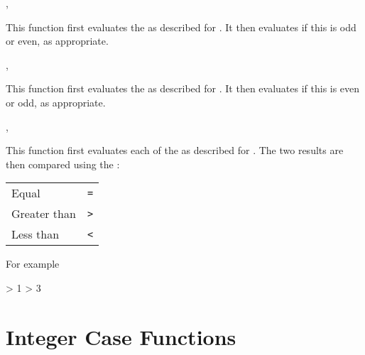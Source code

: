 \documentclass[oneside]{book}
\begin{document}
\begin{function}{\IntIfOdd,\IntIfOddTF}
\begin{syntax}
 
   
\end{syntax}
This function first evaluates the 
as described for .
It then evaluates if this is odd or even, as appropriate.
\end{function}

\begin{function}{\IntIfEven,\IntIfEvenTF}
\begin{syntax}
 
   
\end{syntax}
This function first evaluates the 
as described for .
It then evaluates if this is even or odd, as appropriate.
\end{function}

\begin{function}{\IntCompare,\IntCompareTF}
\begin{syntax}
   
     
\end{syntax}
This function first evaluates each of the 
as described for . The two results are then
compared using the :\par
{\centering\begin{tabular}{ll}
Equal        & \texttt{=} \\
Greater than & \texttt{>} \\
Less than    & \texttt{<} \\
\end{tabular}\par}
For example
\begin{demohigh}
 > {1} {} {}
 > {3} {} {}
\end{demohigh}
\end{function}

\section{Integer Case Functions}
\end{document}
